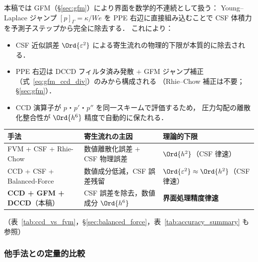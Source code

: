 本稿では GFM（§\ref{sec:gfm}）により界面を数学的不連続として扱う：
Young--Laplace ジャンプ $[p]_\Gamma = \kappa/We$ を PPE 右辺に直接組み込むことで
CSF 体積力を予測子ステップから完全に除去する．
これにより：
\begin{itemize}
  \item CSF 近似誤差 $\Ord{\varepsilon^2}$ による寄生流れの物理的下限が本質的に除去される．
  \item PPE 右辺は DCCD フィルタ済み発散 $+$ GFM ジャンプ補正（式~\eqref{eq:gfm_ccd_div}）のみから構成される
        （Rhie--Chow 補正は不要；§\ref{sec:gfm}）．
  \item CCD 演算子が $p$・$p'$・$p''$ を同一スキームで評価するため，
        圧力勾配の離散化整合性が $\Ord{h^6}$ 精度で自動的に保たれる．
\end{itemize}

\begin{tcolorbox}[resultbox, title={GFM + CCD による寄生流れ抑制（FVM + CSF との比較）}]
\begin{center}
\renewcommand{\arraystretch}{1.2}
\begin{tabular}{lll}
\hline
手法 & 寄生流れの主因 & 理論的下限 \\
\hline
FVM + CSF + Rhie-Chow & 数値離散化誤差 $+$ CSF 物理誤差 & $\Ord{h^2}$（CSF 律速） \\
CCD + CSF + Balanced-Force & 数値成分低減，CSF 誤差残留 & $\Ord{\varepsilon^2} \approx \Ord{h^2}$（CSF 律速） \\
\textbf{CCD + GFM + DCCD}（本稿） & CSF 誤差を除去，数値成分 $\Ord{h^6}$ & \textbf{界面処理精度律速} \\
\hline
\end{tabular}
\end{center}
（表~\ref{tab:ccd_vs_fvm}，§\ref{sec:balanced_force}，表~\ref{tab:accuracy_summary} も参照）
\end{tcolorbox}

\subsubsection{他手法との定量的比較}
\label{sec:ccd_vs_fvm}

